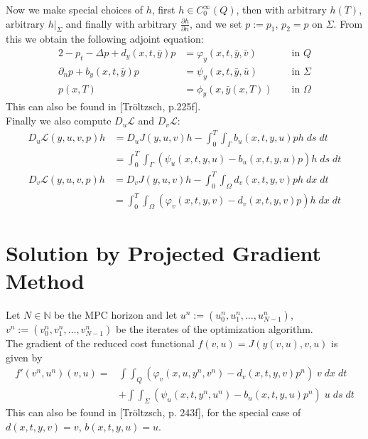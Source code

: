 \documentclass[
12pt, %
a4paper, %
onecolumn, %
portrait %
]{article}
\begin{document}
Now we make special choices of $h$, first $h \in C_0^\infty(Q)$, then with arbitrary $h(T)$, arbitrary $h|_\Sigma$  and finally with arbitrary $\frac{\partial h}{\partial n}$, and we set $p := p_1$, $p_2 = p$ on $\Sigma$. From this we obtain the following adjoint equation:
\begin{alignat*}{2}
-p_t - \Delta p + d_y(x,t,\bar{y}) p &= \varphi_y(x,t,\bar{y}, \bar{v}) &&\text{ in } Q \\
\partial_n p + b_y(x,t,\bar{y}) p &= \psi_y(x,t,\bar{y}, \bar{u}) &&\text{ in } \Sigma \\
p(x,T) &= \phi_y(x, \bar{y}(x,T)) &&\text{ in } \Omega
\end{alignat*}
This can also be found in [Tr\"oltzsch, p.225f].\\
Finally we also compute $D_u \mathcal{L}$ and $D_v \mathcal{L}$:
\begin{align*}
D_u \mathcal{L}(y,u,v, p) h & = D_u J(y,u,v) h - \int_{0}^{T} \int_{\Gamma} b_u(x,t,y,u) p h \; ds \; dt \\
& = \int_{0}^{T} \int_{\Gamma}  (\psi_u(x,t,y,u) -  b_u(x,t,y,u) p)  h \; ds \; dt
\end{align*}
\begin{align*}
D_v \mathcal{L}(y,u,v, p) h & = D_v J(y,u,v) h - \int_{0}^{T} \int_{\Omega} d_v(x,t,y,v) p h \; dx \; dt \\
& = \int_{0}^{T} \int_{\Omega}  (\varphi_v(x,t,y,v) -  d_v(x,t,y,v) p)  h \; dx \; dt
\end{align*}


\section{Solution by Projected Gradient Method}
Let $N \in \mathbb{N}$ be the MPC horizon and let $u^n := (u_0^n, u_1^n, \hdots, u_{N-1}^n)$, $v^n := (v_0^n, v_1^n, \hdots, v_{N-1}^n)$ be the iterates of the optimization algorithm. \\ 
The gradient of the reduced cost functional $f(v,u) = J(y(v,u), v, u)$ is given by
\begin{align*}
f'(v^n, u^n)(v,u) = & \int \int_Q (\varphi_v(x,u, y^n, v^n) - d_v(x,t,y,v) p^n) \; v \; dx \; dt \\
& + \int \int_{\Sigma} (\psi_u(x,t,y^n, u^n) - b_u(x,t,y,u) p^n) \; u \; ds \; dt
\end{align*}
This can also be found in [Tr\"oltzsch, p. 243f], for the special case of $d(x,t,y,v) = v$, $b(x,t,y,u) = u$.
\end{document}
